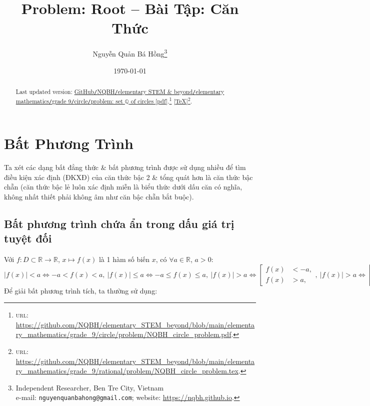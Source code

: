 \documentclass{article}
\title{Problem: Root -- Bài Tập: Căn Thức}
\author{Nguyễn Quản Bá Hồng\footnote{Independent Researcher, Ben Tre City, Vietnam\\e-mail: \texttt{nguyenquanbahong@gmail.com}; website: \url{https://nqbh.github.io}.}}
\date{\today}
\begin{document}
\maketitle
\begin{abstract}
	Last updated version: \href{https://github.com/NQBH/elementary_STEM_beyond/blob/main/elementary_mathematics/grade_9/circle/problem/NQBH_circle_problem.pdf}{GitHub{\tt/}NQBH{\tt/}elementary STEM \& beyond{\tt/}elementary mathematics{\tt/}grade 9{\tt/}circle{\tt/}problem: set $\mathbb{Q}$ of circles [pdf]}.\footnote{\textsc{url}: \url{https://github.com/NQBH/elementary_STEM_beyond/blob/main/elementary_mathematics/grade_9/circle/problem/NQBH_circle_problem.pdf}.} [\href{https://github.com/NQBH/elementary_STEM_beyond/blob/main/elementary_mathematics/grade_9/circle/problem/NQBH_circle_problem.tex}{\TeX}]\footnote{\textsc{url}: \url{https://github.com/NQBH/elementary_STEM_beyond/blob/main/elementary_mathematics/grade_9/rational/problem/NQBH_circle_problem.tex}.}. 
\end{abstract}
\tableofcontents


\section{Bất Phương Trình}
Ta xét các dạng bất đẳng thức \& bất phương trình được sử dụng nhiều để tìm điều kiện xác định (ĐKXĐ) của căn thức bậc 2 \& tổng quát hơn là căn thức bậc chẵn (căn thức bậc lẻ luôn xác định miễn là biểu thức dưới dấu căn có nghĩa, không nhất thiết phải không âm như căn bậc chẵn bắt buộc).

\subsection{Bất phương trình chứa ẩn trong dấu giá trị tuyệt đối}
Với $f:D\subset\mathbb{R}\to\mathbb{R}$, $x\mapsto f(x)$ là 1 hàm số biến $x$, có $\forall a\in\mathbb{R}$, $a > 0$:
\begin{equation*}
	\boxed{|f(x)| < a\Leftrightarrow -a < f(x) < a,\ |f(x)|\le a\Leftrightarrow -a\le f(x)\le a,\ |f(x)| > a\Leftrightarrow\left[\begin{split}
		f(x) &< -a,\\
		f(x) &> a,
	\end{split}\right.,\ |f(x)| > a\Leftrightarrow\left[\begin{split}
	f(x) &\le -a,\\
	f(x) &\ge a.
	\end{split}\right.}
\end{equation*}
Để giải bất phương trình tích, ta thường sử dụng:
\end{document}
